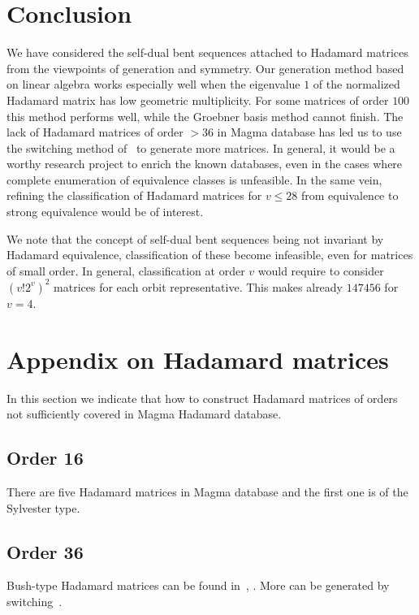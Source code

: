 \documentclass[12pt]{article}
\begin{document}


\section{Conclusion}
\label{sec:con}

We have considered the self-dual bent sequences attached to Hadamard matrices from the viewpoints of generation and symmetry. Our generation method based on linear algebra works especially well
when the eigenvalue $1$ of the normalized Hadamard matrix has low geometric multiplicity. For some matrices of order $100$ this method performs well, while the
Groebner basis method cannot finish. The lack of Hadamard matrices of order $>36$ in Magma database has led us to use the switching method of~\cite{CrnSv:Switching} to generate more matrices. In general,
it would be
a worthy research project  to enrich the known databases, even in the cases where complete enumeration of equivalence classes  is unfeasible. In the same vein, refining the classification
of Hadamard matrices for $v\le 28$ from equivalence to strong equivalence would be of interest.

We note that the concept of self-dual bent sequences being not invariant by Hadamard equivalence, classification of these become infeasible, even for matrices of small order. In general, classification at order $v$ would require
to consider $(v! 2^v)^2$ matrices for each orbit representative. This makes already $147456$ for $v=4$.

\appendix

\section{Appendix on Hadamard matrices}
\label{sec:append}
In this section we indicate that how to construct Hadamard matrices of orders not sufficiently covered in Magma Hadamard database.

\subsection{Order 16}
There are five Hadamard matrices in Magma database and the first one is of the Sylvester type.

\subsection{Order 36}
 Bush-type Hadamard matrices can be found in~\cite{Janko:2001}, \cite{JanKhar:2002}. More can be generated by switching~\cite{CrnSv:Switching}.
\end{document}
